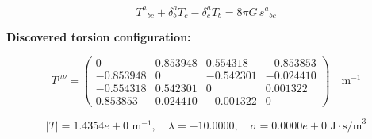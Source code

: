 
\begin{equation}
  T^a{}_{bc} + \delta^a_b T_c - \delta^a_c T_b = 8\pi G \, s^a{}_{bc}
\end{equation}

\textbf{Discovered torsion configuration:}

\begin{equation}
  T^{\mu\nu} = \begin{pmatrix}
    0 & 0.853948 & 0.554318 & -0.853853 \\
    -0.853948 & 0 & -0.542301 & -0.024410 \\
    -0.554318 & 0.542301 & 0 & 0.001322 \\
    0.853853 & 0.024410 & -0.001322 & 0
  \end{pmatrix} \quad \text{m}^{-1}
\end{equation}

\begin{equation}
  |T| = 1.4354e+0 \text{ m}^{-1}, \quad
  \lambda = -10.0000, \quad
  \sigma = 0.0000e+0 \text{ J}\cdot\text{s/m}^3
\end{equation}